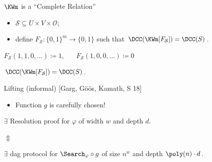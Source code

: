 \begin{frame}{$\KWm$ is a ``Complete Relation''}

    \begin{itemize}
        \item $\mathcal{S} \subseteq U \times V \times \mathcal{O}$;
        \item define $F_{\mathcal{S}}\colon \{0, 1\}^m \to \{0, 1\}$ such that
            $\DCC(\KWm[F_{\mathcal{S}}]) = \DCC(S)$.
    \end{itemize}

    \pause

    \vspace{-0.2cm}
    \begin{center}
        
    \end{center}

    \pause
    $F_{\mathcal{S}}(1, 1, 0, \dots) \coloneqq 1$\pause, ~~~$F_{\mathcal{S}}(1, 0, 0, \dots) \coloneqq 0$

    \pause
    \begin{lemma}
        $\DCC(\KWm[F_{\mathcal{S}}]) = \DCC(S)$.
    \end{lemma}

    \pause

\end{frame}



\begin{frame}{Lifting (informal) [Garg, G\"{o}\"{o}s, Kamath, S 18]}


    \begin{itemize}
        \item Function $g$ is carefully chosen!
    \end{itemize}

    \vspace{1cm}
    \begin{center}
        \alert{$\exists$} Resolution proof for $\varphi$ of width $w$ and depth $d$.

        $\Updownarrow$
        
        \alert{$\exists$} dag protocol for $\Search_{\varphi} \circ g$ of size $n^w$ and depth $\poly(n)
        \cdot d$.
    \end{center}

\end{frame}